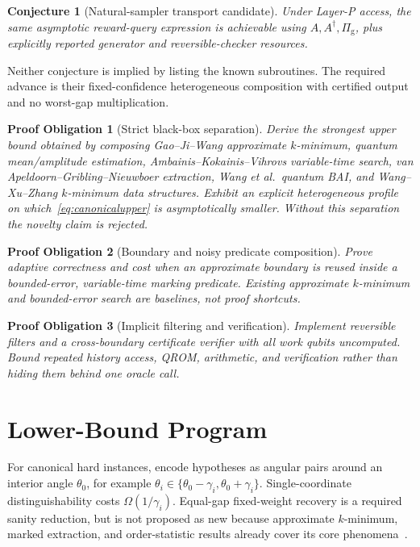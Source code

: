 \documentclass[10pt]{article}
\newtheorem{conjecture}{Conjecture}
\newtheorem{obligation}{Proof Obligation}
\theoremstyle{definition}
\begin{document}
\begin{conjecture}[Natural-sampler transport candidate]
Under Layer-P access, the same asymptotic reward-query expression is achievable
using $A,A^\dagger,\Pi_{\mathrm g}$, plus explicitly reported generator and
reversible-checker resources.
\end{conjecture}

Neither conjecture is implied by listing the known subroutines.  The required
advance is their fixed-confidence heterogeneous composition with certified output
and no worst-gap multiplication.

\begin{obligation}[Strict black-box separation]
Derive the strongest upper bound obtained by composing
Gao--Ji--Wang approximate $k$-minimum, quantum mean/amplitude estimation,
Ambainis--Kokainis--Vihrovs variable-time search,
van Apeldoorn--Gribling--Nieuwboer extraction, Wang et al.\ quantum BAI, and
Wang--Xu--Zhang $k$-minimum data structures.  Exhibit an explicit heterogeneous
profile on which~\eqref{eq:canonicalupper} is asymptotically smaller.  Without this
separation the novelty claim is rejected.
\end{obligation}

\begin{obligation}[Boundary and noisy predicate composition]
Prove adaptive correctness and cost when an approximate boundary is reused inside
a bounded-error, variable-time marking predicate.  Existing approximate
$k$-minimum and bounded-error search are baselines, not proof shortcuts.
\end{obligation}

\begin{obligation}[Implicit filtering and verification]
Implement reversible filters and a cross-boundary certificate verifier with all
work qubits uncomputed.  Bound repeated history access, QROM, arithmetic, and
verification rather than hiding them behind one oracle call.
\end{obligation}

\section{Lower-Bound Program}

For canonical hard instances, encode hypotheses as angular pairs around an
interior angle $\theta_0$, for example
$\theta_i\in\{\theta_0-\gamma_i,\theta_0+\gamma_i\}$.  Single-coordinate
distinguishability costs $\Omega(1/\gamma_i)$.  Equal-gap fixed-weight recovery is
a required sanity reduction, but is not proposed as new because approximate
$k$-minimum, marked extraction, and order-statistic results already cover its
core phenomena~\cite{gao2025approxkmin,vanapeldoorn2024marked,nayak1999median}.
\end{document}
